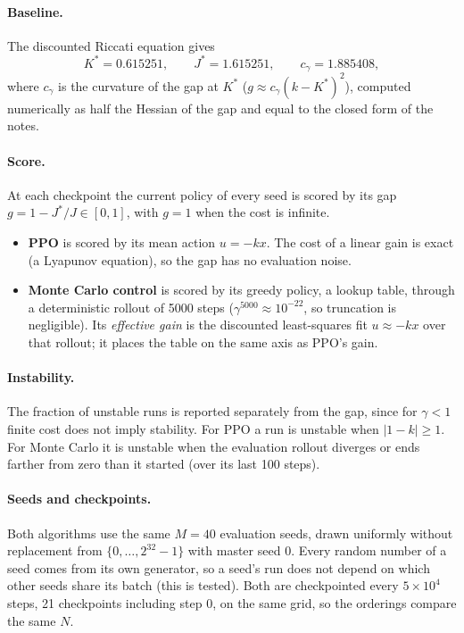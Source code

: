 \documentclass[11pt]{article}
\begin{document}
\paragraph{Baseline.} The discounted Riccati equation gives
\[
  K^* = 0.615251, \qquad J^* = 1.615251, \qquad c_\gamma = 1.885408,
\]
where $c_\gamma$ is the curvature of the gap at $K^*$ ($g \approx c_\gamma (k - K^*)^2$), computed
numerically as half the Hessian of the gap and equal to the closed form of the notes.

\paragraph{Score.} At each checkpoint the current policy of every seed is scored by its gap
$g = 1 - J^*/J \in [0, 1]$, with $g = 1$ when the cost is infinite.
\begin{itemize}[leftmargin=*]
  \item \textbf{PPO} is scored by its mean action $u = -kx$. The cost of a linear gain is exact (a
    Lyapunov equation), so the gap has no evaluation noise.
  \item \textbf{Monte Carlo control} is scored by its greedy policy, a lookup table, through a
    deterministic rollout of 5000 steps ($\gamma^{5000} \approx 10^{-22}$, so truncation is
    negligible). Its \emph{effective gain} is the discounted least-squares fit $u \approx -kx$
    over that rollout; it places the table on the same axis as PPO's gain.
\end{itemize}

\paragraph{Instability.} The fraction of unstable runs is reported separately from the gap, since for
$\gamma < 1$ finite cost does not imply stability. For PPO a run is unstable when
$|1 - k| \ge 1$. For Monte Carlo it is unstable when the evaluation rollout diverges or ends farther
from zero than it started (over its last 100 steps).

\paragraph{Seeds and checkpoints.} Both algorithms use the same $M = 40$ evaluation seeds, drawn
uniformly without replacement from $\{0, \dots, 2^{32}-1\}$ with master seed 0. Every random number
of a seed comes from its own generator, so a seed's run does not depend on which other seeds share
its batch (this is tested). Both are checkpointed every $5 \times 10^4$ steps, 21 checkpoints
including step 0, on the same grid, so the orderings compare the same $N$.
\end{document}
